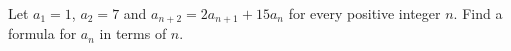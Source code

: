 Let $a_1=1$, $a_2=7$ and $a_{n+2}=2a_{n+1}+15a_n$ for every positive integer $n$. Find a formula for $a_n$ in terms of $n$.
